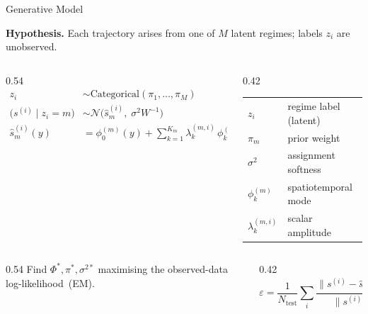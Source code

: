 \documentclass[aspectratio=169]{beamer}
\begin{document}
\begin{frame}{Generative Model}

\textbf{Hypothesis.} Each trajectory arises from one of $M$ latent regimes; labels $z_i$ are unobserved.

\medskip

\begin{columns}[c]
\begin{column}{0.54\textwidth}
  \small
  \begin{align*}
    z_i
      &\sim \mathrm{Categorical}(\pi_1,\ldots,\pi_M) \\[5pt]
    \bigl(s^{(i)} \mid z_i{=}m\bigr)
      &\sim \mathcal{N}\!\bigl(\hat{s}_m^{(i)},\;\sigma^2 W^{-1}\bigr) \\[5pt]
    \hat{s}_m^{(i)}(y)
      &= \phi_0^{(m)}(y)
         + \sum_{k=1}^{K_m}\lambda_k^{(m,i)}\,\phi_k^{(m)}(y)
  \end{align*}
\end{column}
\begin{column}{0.42\textwidth}
  \small\renewcommand{\arraystretch}{1.5}
  \begin{tabular}{ll}
    $z_i$               & regime label (latent)  \\
    $\pi_m$             & prior weight           \\
    $\sigma^2$          & assignment softness    \\
    $\phi_k^{(m)}$      & spatiotemporal mode    \\
    $\lambda_k^{(m,i)}$ & scalar amplitude       \\
  \end{tabular}
\end{column}
\end{columns}

\medskip

\begin{columns}[c]
\begin{column}{0.54\textwidth}
  \small Find $\Phi^*,\pi^*,\sigma^{2*}$
  maximising the observed-data log-likelihood~(EM).
\end{column}
\begin{column}{0.42\textwidth}
  \[
    \varepsilon = \frac{1}{N_{\mathrm{test}}}
    \sum_{i}\frac{\|s^{(i)}-\hat{s}^{(i)}\|_w}{\|s^{(i)}\|_w}
  \]
\end{column}
\end{columns}

\end{frame}
\end{document}
